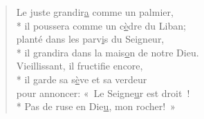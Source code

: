 \begin{verse}
Le juste grandir\underline{a} comme un palmier, \\*
il poussera comme un c\underline{è}dre du Liban; \\
planté dans les parv\underline{i}s du Seigneur, \\*
il grandira dans la mais\underline{o}n de notre Dieu. \\

Vieillissant, il fructif\underline{i}e encore, \\*
il garde sa s\underline{è}ve et sa verdeur \\
pour annoncer: « Le Seigne\underline{u}r est droit ! \\*
Pas de ruse en Die\underline{u}, mon rocher! » \\
\end{verse}

